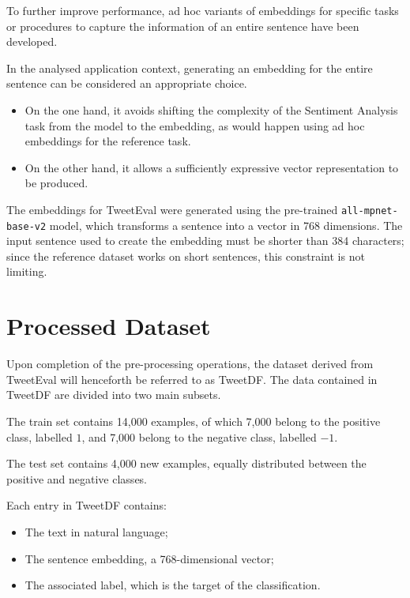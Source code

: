 To further improve performance, ad hoc variants of embeddings for specific tasks\cite{sentimentEmbedding} or procedures to capture the information of an entire sentence\cite{sentence-bert} have been developed.

In the analysed application context, generating an embedding for the entire sentence can be considered an appropriate choice. 
\begin{itemize}
    \item On the one hand, it avoids shifting the complexity of the Sentiment Analysis task from the model to the embedding, as would happen using ad hoc embeddings for the reference task.
    \item On the other hand, it allows a sufficiently expressive vector representation to be produced.
\end{itemize}

The embeddings for TweetEval were generated using the pre-trained \verb|all-mpnet-base-v2| model, which transforms a sentence into a vector in 768 dimensions. The input sentence used to create the embedding must be shorter than 384 characters; since the reference dataset works on short sentences, this constraint is not limiting.

\section{Processed Dataset}\label{sec:tweetdf}

Upon completion of the pre-processing operations, the dataset derived from TweetEval will henceforth be referred to as TweetDF. The data contained in TweetDF are divided into two main subsets.

The train set contains 14,000 examples, of which 7,000 belong to the positive class, labelled $1$, and 7,000 belong to the negative class, labelled $-1$.

The test set contains 4,000 new examples, equally distributed between the positive and negative classes.

Each entry in TweetDF contains:
\begin{itemize}
    \item The text in natural language;
    \item The sentence embedding, a 768-dimensional vector;
    \item The associated label, which is the target of the classification.
\end{itemize}
